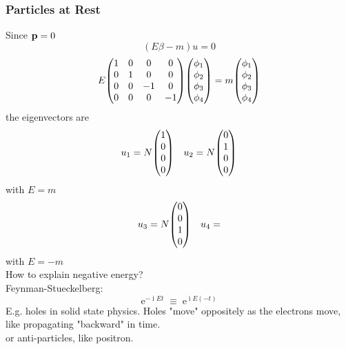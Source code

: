 \documentclass[a4paper]{article}
\DeclareMathOperator{\e}{\mathrm{e}}
\DeclareMathOperator{\I}{\mathrm{i}}
\numberwithin{equation}{section}
\begin{document}
\subsubsection{Particles at Rest}
Since $ \vb{p} = 0 $
\begin{equation}\label{key}
(E\beta - m)u = 0
\end{equation}
\begin{equation}\label{key}
E \mqty(1 & 0 & 0 & 0\\
        0 & 1 & 0 & 0\\
        0 & 0 & -1 & 0\\
        0 & 0 & 0 & -1) \mqty(\phi_1\\\phi_2\\\phi_3\\\phi_4)
 = m \mqty(\phi_1\\\phi_2\\\phi_3\\\phi_4)
\end{equation}
the eigenvectors are
\begin{equation}\label{key}
u_1 = N\mqty(1\\0\\0\\0) \quad u_2 = N\mqty(0\\1\\0\\0)
\end{equation}
with $ E = m $
\begin{equation}\label{key}
u_3 = N\mqty(0\\0\\1\\0) \quad u_4 = 
\end{equation}
with $ E = -m $\\

How to explain negative energy?\\
Feynman-Stueckelberg:
\begin{equation}\label{key}
\e^{-\I Et} \equiv \e^{\I E (-t)}
\end{equation}
E.g. holes in solid state physics. Holes "move" oppositely as the electrons move, like propagating "backward" in time.\\
or anti-particles, like positron.
\end{document}
